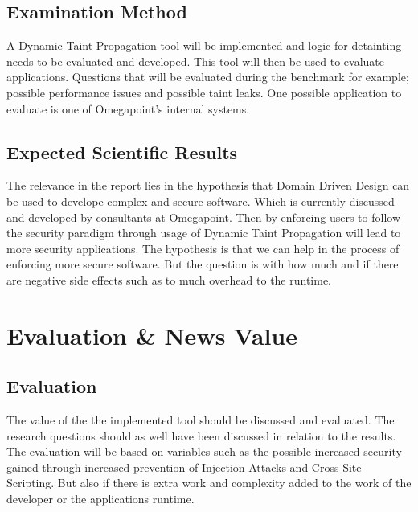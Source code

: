 \documentclass{../kththesis}
\begin{document}
\section{Examination Method}
A Dynamic Taint Propagation tool will be implemented and logic for detainting needs to be evaluated and developed. This tool will then be used to evaluate applications. Questions that will be evaluated during the benchmark for example; possible performance issues and possible taint leaks. One possible application to evaluate is one of Omegapoint's internal systems.


\section{Expected Scientific Results}
The relevance in the report lies in the hypothesis that Domain Driven Design can be used to develope complex and secure software. Which is currently discussed and developed by consultants at Omegapoint. Then by enforcing users to follow the security paradigm through usage of Dynamic Taint Propagation will lead to more security applications. The hypothesis is that we can help in the process of enforcing more secure software. But the question is with how much and if there are negative side effects such as to much overhead to the runtime.



\chapter{Evaluation \& News Value}
\section{Evaluation}
The value of the the implemented tool should be discussed and evaluated. The research questions should as well have been discussed in relation to the results. The evaluation will be based on variables such as the possible increased security gained through increased prevention of Injection Attacks and Cross-Site Scripting. But also if there is extra work and complexity added to the work of the developer or the applications runtime.
\end{document}
